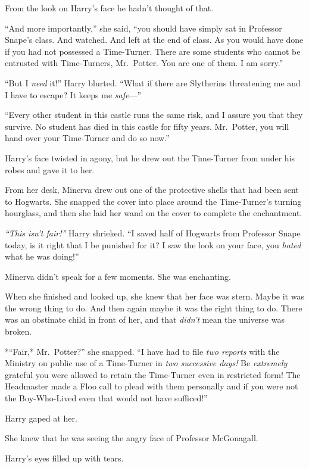 From the look on Harry's face he hadn't thought of that.

``And more importantly,'' she said, ``you should have simply sat in
Professor Snape's class. And watched. And left at the end of class. As
you would have done if you had not possessed a Time-Turner. There are
some students who cannot be entrusted with Time-Turners, Mr.~Potter. You
are one of them. I am sorry.''

``But I \emph{need} it!'' Harry blurted. ``What if there are Slytherins
threatening me and I have to escape? It keeps me \emph{safe}---''

``Every other student in this castle runs the same risk, and I assure
you that they survive. No student has died in this castle for fifty
years. Mr.~Potter, you will hand over your Time-Turner and do so now.''

Harry's face twisted in agony, but he drew out the Time-Turner from
under his robes and gave it to her.

From her desk, Minerva drew out one of the protective shells that had
been sent to Hogwarts. She snapped the cover into place around the
Time-Turner's turning hourglass, and then she laid her wand on the cover
to complete the enchantment.

\emph{``This isn't fair!''} Harry shrieked. ``I saved half of Hogwarts
from Professor Snape today, is it right that I be punished for it? I saw
the look on your face, you \emph{hated} what he was doing!''

Minerva didn't speak for a few moments. She was enchanting.

When she finished and looked up, she knew that her face was stern. Maybe
it was the wrong thing to do. And then again maybe it was the right
thing to do. There was an obstinate child in front of her, and that
\emph{didn't} mean the universe was broken.

*``Fair,* Mr.~Potter?'' she snapped. ``I have had to file \emph{two
reports} with the Ministry on public use of a Time-Turner in \emph{two
successive days!} Be \emph{extremely} grateful you were allowed to
retain the Time-Turner even in restricted form! The Headmaster made a
Floo call to plead with them personally and if you were not the
Boy-Who-Lived even that would not have sufficed!''

Harry gaped at her.

She knew that he was seeing the angry face of Professor McGonagall.

Harry's eyes filled up with tears.

